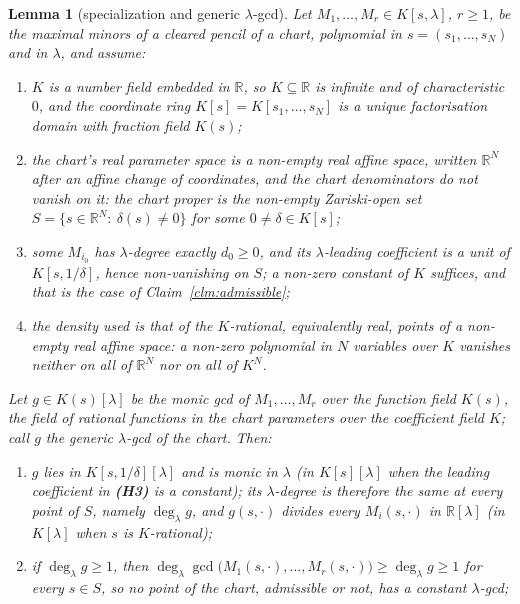 \documentclass[journal]{IEEEtran}
\theoremstyle{plainn}
\newtheorem{lem}[thm]{Lemma}
\theoremstyle{remark}
\begin{document}
\begin{lem}[specialization and generic $\lambda$-gcd]\label{lem:genericgcd}
Let $M_1,\dots,M_r\in K[s,\lambda]$, $r\ge1$, be the maximal minors of a cleared pencil of a chart,
polynomial in $s=(s_1,\dots,s_N)$ and in $\lambda$, and assume:
\begin{enumerate}[label=\textbf{(H\arabic*)},leftmargin=*,itemsep=1pt,topsep=2pt]
\item $K$ is a number field embedded in $\mathbb R$, so $K\subseteq\mathbb R$ is infinite and of
characteristic $0$, and the coordinate ring $K[s]=K[s_1,\dots,s_N]$ is a unique factorisation domain with
fraction field $K(s)$;
\item the chart's real parameter space is a non-empty real affine space, written $\mathbb R^N$ after an
affine change of coordinates, and the chart denominators do not vanish on it: the chart proper is the
non-empty Zariski-open set $S=\{s\in\mathbb R^N:\ \delta(s)\neq0\}$ for some $0\neq\delta\in K[s]$;
\item some $M_{i_0}$ has $\lambda$-degree exactly $d_0\ge0$, and its $\lambda$-leading coefficient is a unit
of $K[s,1/\delta]$, hence non-vanishing on $S$; a non-zero constant of $K$ suffices, and that is the case
of Claim~\ref{clm:admissible};
\item the density used is that of the $K$-rational, equivalently real, points of a non-empty real affine
space: a non-zero polynomial in $N$ variables over $K$ vanishes neither on all of $\mathbb R^N$ nor on all
of $K^N$.
\end{enumerate}
Let $g\in K(s)[\lambda]$ be the monic gcd of $M_1,\dots,M_r$ over the function field $K(s)$, the field of
rational functions in the chart parameters over the coefficient field $K$; call $g$ the \emph{generic
$\lambda$-gcd} of the chart. Then:
\begin{enumerate}[label=(\arabic*),leftmargin=*,itemsep=1pt,topsep=2pt]
\item $g$ lies in $K[s,1/\delta][\lambda]$ and is monic in $\lambda$ (in $K[s][\lambda]$ when the leading
coefficient in \textbf{(H3)} is a constant); its $\lambda$-degree is therefore the same at every point of
$S$, namely $\deg_\lambda g$, and $g(s,\cdot)$ divides every $M_i(s,\cdot)$ in $\mathbb R[\lambda]$ (in
$K[\lambda]$ when $s$ is $K$-rational);
\item if $\deg_\lambda g\ge1$, then
$\deg_\lambda\gcd\bigl(M_1(s,\cdot),\dots,M_r(s,\cdot)\bigr)\ge\deg_\lambda g\ge1$ for every $s\in S$, so
no point of the chart, admissible or not, has a constant $\lambda$-gcd;

\end{enumerate}
\end{lem}
\end{document}
